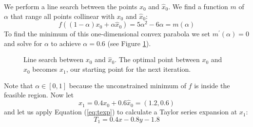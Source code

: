 We perform a line search between the points $x_0$ and $\hat{x}_0$.
We find a function $m$ of $\alpha$ that range all points collinear with $x_0$
and $\hat{x}_0$:
\[
f((1-\alpha) x_0 + \alpha \hat{x}_0) = 5\alpha^2 - 6\alpha = m(\alpha)
\]
To find the minimum of this one-dimensional convex parabola we set
$m^\prime(\alpha) = 0$ and solve for $\alpha$ to achieve $\alpha = 0.6$
(see Figure \ref{fig:steplength}).
\begin{figure}[ht!]
    \centering
    
    \caption{Line search between $x_0$ and $\hat{x}_0$. The optimal point
             between $x_0$ and $\hat{x}_0$ becomes $x_1$, our starting point
             for the next iteration.}
    \label{fig:steplength}
\end{figure}

Note that $\alpha \in [0, 1]$ because the unconstrained minimum of $f$ is
inside the feasible region.
Now let
\[
x_1 = 0.4x_0 + 0.6\hat{x}_0 = (1.2, 0.6)
\]
and let us apply Equation (\ref{eq:texp}) to calculate a Taylor series
expansion at $x_1$:
\[
    T_1 = 0.4x - 0.8y - 1.8
\]

